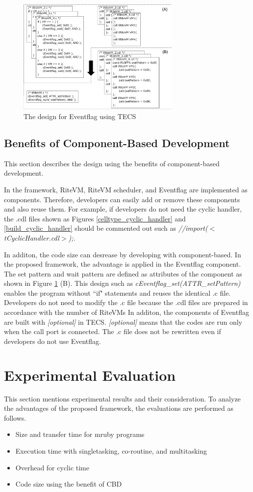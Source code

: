 \documentclass[conference,compsoc]{IEEEtran}
\begin{document}
\begin{figure}[t]
    \centering
    \includegraphics[width=8cm,clip]{figure/Eventflag.pdf}
    \caption{The design for Eventflag using TECS}
    \label{fig:Eventflag}
\end{figure}
 
\subsection{Benefits of Component-Based Development}
This section describes the design using the benefits of component-based development.

In the framework, RiteVM, RiteVM scheduler, and Eventflag are implemented as components.
Therefore, developers can easily add or remove these components and also reuse them.
For example, if developers do not need the cyclic handler, the .cdl files shown as Figures \ref{celltype_cyclic_handler} and \ref{build_cyclic_handler} should be commented out such as {\it //import($<$tCyclicHandler.cdl$>$);}.

In additon, the code size can desrease by developing with component-based. 
In the proposed framework, the advantage is applied in the Eventflag component.
The set pattern and wait pattern are defined as attributes of the component as shown in Figure \ref{fig:Eventflag} (B).
This design such as {\it cEventflag\_set(ATTR\_setPattern)} enables the program without ``if" statements and reuses the identical .c file.
Developers do not need to modify the .c file because the .cdl files are prepared in accordance with the number of RiteVMs
In additon, the components of Eventflag are built with {\it [optional]} in TECS.
{\it [optional]} means that the codes are run only when the call port is connected.
The .c file does not be rewritten even if developers do not use Eventflag. 

\section{Experimental Evaluation}
\label{sec:Evaluation}
This section mentions experimental results and their consideration.
To analyze the advantages of the proposed framework, the evaluations are performed as follows.
\begin{itemize}
    \item Size and transfer time for mruby programs
    \item Execution time with singletasking, co-routine, and multitasking
    \item Overhead for cyclic time
    \item Code size using the benefit of CBD 
\end{itemize}
\end{document}
